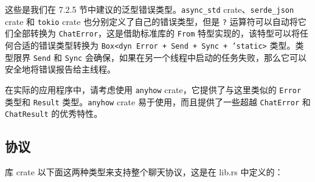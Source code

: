 这些是我们在 7.2.5 节中建议的泛型错误类型。\texttt{async\_std} crate、\texttt{serde\_json} crate 和 \texttt{tokio} crate 也分别定义了自己的错误类型，但是 \texttt{?} 运算符可以自动将它们全部转换为 \texttt{ChatError}，这是借助标准库的 \texttt{From} 特型实现的，该特型可以将任何合适的错误类型转换为 \texttt{Box<dyn Error + Send + Sync + 'static>} 类型。类型限界 \texttt{Send} 和 \texttt{Sync} 会确保，如果在另一个线程中启动的任务失败，那么它可以安全地将错误报告给主线程。

在实际的应用程序中，请考虑使用 \texttt{anyhow} crate，它提供了与这里类似的 \texttt{Error} 类型和 \texttt{Result} 类型。\texttt{anyhow} crate 易于使用，而且提供了一些超越 \texttt{ChatError} 和 \texttt{ChatResult} 的优秀特性。

\subsection{协议}

库 crate 以下面这两种类型来支持整个聊天协议，这是在 lib.rs 中定义的：


